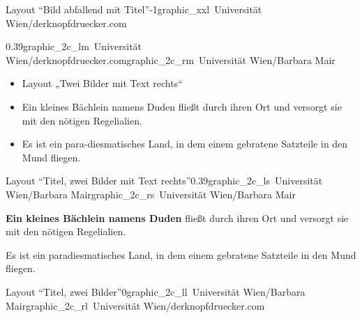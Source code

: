 \documentclass[hyperref={pdfpagelabels=false}, aspectratio=169, t]{beamer}  %
\begin{document}
\begin{graphicsFrame}{Layout ``Bild abfallend mit Titel''}{}{-1}{}{graphic_xxl}{\textcopyright~Universität Wien/derknopfdruecker.com}

\end{graphicsFrame}

\begin{graphicsFrame2}{}{0.39}{graphic_2c_lm}{\textcopyright~Universität Wien/derknopfdruecker.com}{graphic_2c_rm}{\textcopyright~Universität Wien/Barbara Mair}

		\begin{itemize}
			\item Layout „Twei Bilder mit Text rechts“ 
			\item Ein kleines Bächlein namens Duden fließt durch ihren Ort und versorgt sie mit den nötigen Regelialien.
			\item Es ist ein para-diesmatisches Land, in dem einem gebratene Satzteile in den Mund fliegen.
		\end{itemize}

\end{graphicsFrame2}

\begin{graphicsFrame2}{Layout ``Titel, zwei Bilder mit Text rechts''}{0.39}{graphic_2c_ls}{\textcopyright~Universität Wien/Barbara Mair}{graphic_2c_rs}{\textcopyright~Universität Wien/Barbara Mair}

	\textbf{Ein kleines Bächlein namens Duden} fließt durch ihren Ort und versorgt sie mit den nötigen Regelialien.
	\smallskip

	Es ist ein paradiesmatisches Land, in dem einem gebratene Satzteile in den Mund fliegen.

\end{graphicsFrame2}

\begin{graphicsFrame2}{Layout ``Titel, zwei Bilder''}{0}{graphic_2c_ll}{\textcopyright~Universität Wien/Barbara Mair}{graphic_2c_rl}{\textcopyright~Universität Wien/derknopfdruecker.com}

\end{graphicsFrame2}


\end{document}
